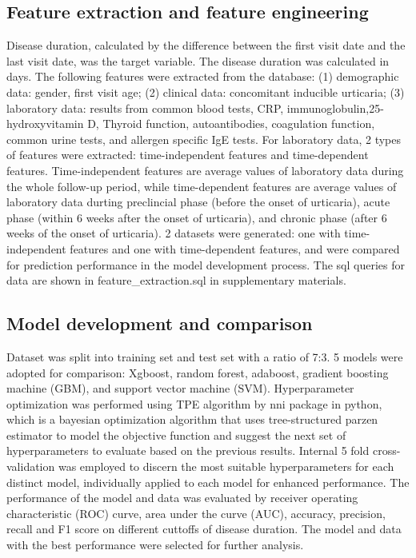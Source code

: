 \documentclass[preprint,12pt,authoryear]{elsarticle}
\begin{document}
\subsection{Feature extraction and feature engineering}\label{FeatureEngineering}
Disease duration, calculated by the difference between the first visit date and the last visit date, was the target variable. The disease duration was calculated in days. The following features were extracted from the database: (1) demographic data: gender, first visit age; (2) clinical data: concomitant inducible urticaria; (3) laboratory data: results from common blood tests, CRP, immunoglobulin,25-hydroxyvitamin D, Thyroid function, autoantibodies, coagulation function, common urine tests, and allergen specific IgE tests. 
For laboratory data, 2 types of features were extracted: time-independent features and time-dependent features. Time-independent features are average values of laboratory data during the whole follow-up period, while time-dependent features are average values of laboratory data durting preclincial phase (before the onset of urticaria), acute phase (within 6 weeks after the onset of urticaria), and chronic phase (after 6 weeks of the onset of urticaria). 2 datasets were generated: one with time-independent features and one with time-dependent features, and were compared for prediction performance in the model development process. The sql queries for data are shown in feature\_extraction.sql in supplementary materials.

\subsection{Model development and comparison}\label{Training}
Dataset was split into training set and test set with a ratio of 7:3. 5 models were adopted for comparison: Xgboost, random forest, adaboost, gradient boosting machine (GBM), and support vector machine (SVM). Hyperparameter optimization was performed using TPE algorithm by nni package in python, which is a bayesian optimization algorithm that uses tree-structured parzen estimator to model the objective function and suggest the next set of hyperparameters to evaluate based on the previous results. Internal 5 fold cross-validation was employed to discern the most suitable hyperparameters for each distinct model, individually applied to each model for enhanced performance. The performance of the model and data was evaluated by receiver operating characteristic (ROC) curve, area under the curve (AUC), accuracy, precision, recall and F1 score on different cuttoffs of disease duration. The model and data with the best performance were selected for further analysis.
\end{document}
